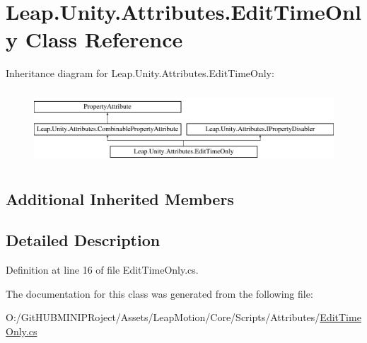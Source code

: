 \hypertarget{class_leap_1_1_unity_1_1_attributes_1_1_edit_time_only}{}\section{Leap.\+Unity.\+Attributes.\+Edit\+Time\+Only Class Reference}
\label{class_leap_1_1_unity_1_1_attributes_1_1_edit_time_only}
Inheritance diagram for Leap.\+Unity.\+Attributes.\+Edit\+Time\+Only\+:\begin{figure}[H]
\begin{center}
\leavevmode
\includegraphics[height=2.772277cm]{class_leap_1_1_unity_1_1_attributes_1_1_edit_time_only}
\end{center}
\end{figure}
\subsection*{Additional Inherited Members}


\subsection{Detailed Description}


Definition at line 16 of file Edit\+Time\+Only.\+cs.



The documentation for this class was generated from the following file\+:\begin{DoxyCompactItemize}
\item 
O\+:/\+Git\+H\+U\+B\+M\+I\+N\+I\+P\+Roject/\+Assets/\+Leap\+Motion/\+Core/\+Scripts/\+Attributes/\mbox{\hyperlink{_edit_time_only_8cs}{Edit\+Time\+Only.\+cs}}\end{DoxyCompactItemize}
